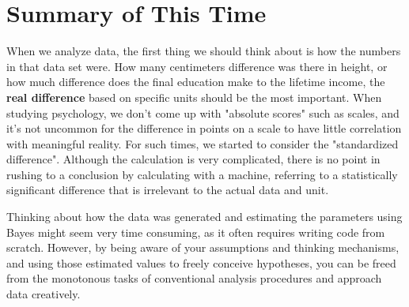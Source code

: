 \documentclass{ltjsbook}
\begin{document}
{\section{Summary of This Time}
When we analyze data, the first thing we should think about is how the numbers in that data set were. How many centimeters difference was there in height, or how much difference does the final education make to the lifetime income, the \textbf{real difference} based on specific units should be the most important.
When studying psychology, we don't come up with "absolute scores" such as scales, and it's not uncommon for the difference in points on a scale to have little correlation with meaningful reality. For such times, we started to consider the "standardized difference". Although the calculation is very complicated, there is no point in rushing to a conclusion by calculating with a machine, referring to a statistically significant difference that is irrelevant to the actual data and unit.

Thinking about how the data was generated and estimating the parameters using Bayes might seem very time consuming, as it often requires writing code from scratch. However, by being aware of your assumptions and thinking mechanisms, and using those estimated values to freely conceive hypotheses, you can be freed from the monotonous tasks of conventional analysis procedures and approach data creatively.
}
\end{document}
